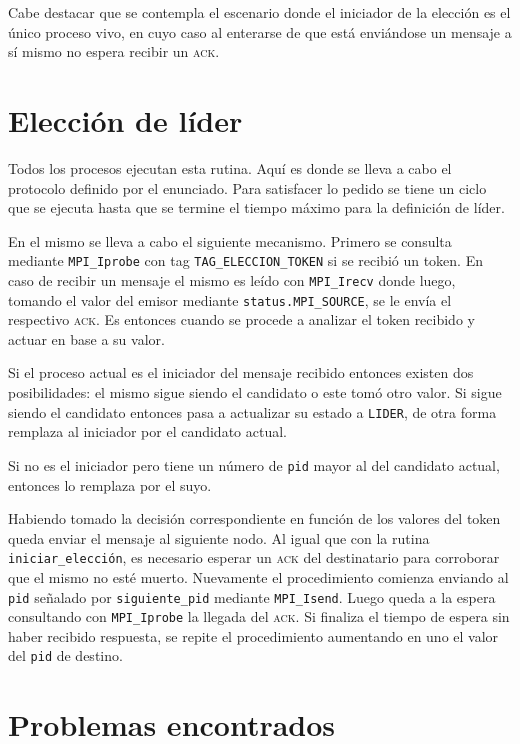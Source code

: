 \documentclass[a4paper]{article}
\newcommand{\acr}[1]{\textsc{\lowercase{#1}}}
\begin{document}
Cabe destacar que se contempla el escenario donde el iniciador de la elección es
el único proceso vivo, en cuyo caso al enterarse de que está enviándose un mensaje a
sí mismo no espera recibir un \acr{ACK}.

\section{Elección de líder}

Todos los procesos ejecutan esta rutina. Aquí es donde se lleva a cabo el
protocolo definido por el enunciado. Para satisfacer lo pedido se tiene un ciclo
que se ejecuta hasta que se termine el tiempo máximo para la definición de
líder.

En el mismo se lleva a cabo el siguiente mecanismo. Primero se consulta mediante
\texttt{MPI\_Iprobe} con tag \texttt{TAG\_ELECCION\_TOKEN} si se recibió
un token. En caso de recibir un mensaje el mismo es leído con \texttt{MPI\_Irecv} donde
luego, tomando el valor del emisor mediante \texttt{status.MPI\_SOURCE}, se le envía
el respectivo \acr{ACK}. Es entonces cuando se procede a analizar el token
recibido y actuar en base a su valor.

Si el proceso actual es el iniciador del mensaje recibido entonces existen dos
posibilidades: el mismo sigue siendo el candidato o este tomó otro valor. Si
sigue siendo el candidato entonces pasa a actualizar su estado a \texttt{LIDER},
de otra forma remplaza al iniciador por el candidato actual.

Si no es el iniciador pero tiene un número de \texttt{pid} mayor al del
candidato actual, entonces lo remplaza por el suyo.

Habiendo tomado la decisión correspondiente en función de los valores del token
queda enviar el mensaje al siguiente nodo. Al igual que con la rutina
\texttt{iniciar\_elección}, es necesario esperar un \acr{ACK} del destinatario
para corroborar que el mismo no esté muerto. Nuevamente el procedimiento
comienza enviando al \texttt{pid} señalado por \texttt{siguiente\_pid} mediante
\texttt{MPI\_Isend}. Luego queda a la espera consultando con
\texttt{MPI\_Iprobe} la llegada del \acr{ACK}. Si finaliza el tiempo de
espera sin haber recibido respuesta, se repite el procedimiento aumentando en
uno el valor del \texttt{pid} de destino.

\section{Problemas encontrados}
\end{document}
